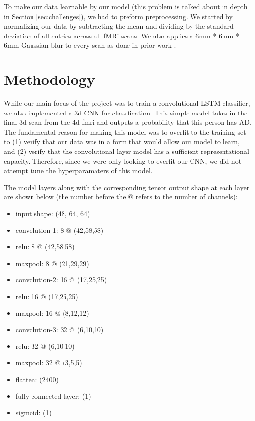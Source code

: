 \documentclass[11pt]{article}
\begin{document}
	To make our data learnable by our model (this problem is talked about in depth in Section \ref{sec:challenges}), we had to preform preprocessing. We started by normalizing our data by subtracting the mean and dividing by the standard deviation of all entries across all fMRi scans. We also applies a 6mm * 6mm * 6mm Gaussian blur to every scan as done in prior work \cite{Conv-LSTM}.    
	
	
	
	\section{Methodology}

	While our main focus of the project was to train a convolutional LSTM classifier, we also implemented a 3d CNN for classification. This simple model takes in the final 3d scan from the 4d fmri and outputs a probability that this person has AD. The fundamental reason for making this model was to overfit to the training set to (1) verify that our data was in a form that would allow our model to learn, and (2) verify that the convolutional layer model has a sufficient representational capacity. Therefore, since we were only looking to overfit our CNN, we did not attempt tune the hyperparamaters of this model. 
	
	The model layers along with the corresponding tensor output shape at each layer are shown below (the number before the @ refers to the number of channels):
		\begin{itemize}
			\item input shape: (48, 64, 64)
			\item convolution-1: 8 @ (42,58,58)
			\item relu: 8 @ (42,58,58)
			\item maxpool: 8 @ (21,29,29)
			\item convolution-2: 16 @ (17,25,25)
			\item relu: 16 @ (17,25,25)
			\item maxpool: 16 @ (8,12,12)
			\item convolution-3: 32 @ (6,10,10)
			\item relu: 32 @ (6,10,10)
			\item maxpool: 32 @ (3,5,5)
			\item flatten: (2400)
			\item fully connected layer: (1)
			\item sigmoid: (1)
		\end{itemize}
		
\end{document}
